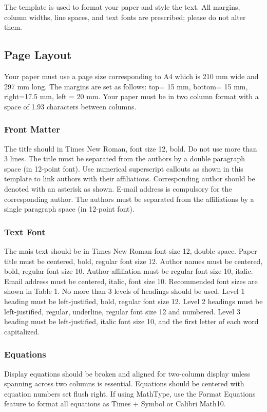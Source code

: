 \documentclass{siintec}
\begin{document}
The template is used to format your paper and style the text. All margins, column widths, line spaces, and text fonts are prescribed; please do not alter them. 

\subsection{Page Layout}
Your paper must use a page size corresponding to A4 which is 210 mm wide and 297 mm long. The margins are set as follows: top= 15 mm, bottom= 15 mm, right=17.5 mm, left = 20 mm. Your paper must be in two column format with a space of 1.93 characters between columns.

\subsubsection{Front Matter}
The title should in Times New Roman, font size 12, bold. Do not use more than 3 lines. The title must be separated from the authors by a double paragraph space (in 12-point font). Use numerical superscript callouts as shown in this template to link authors with their affiliations.
Corresponding author should be denoted with an asterisk as shown. E-mail address is compulsory for the corresponding author.
The authors must be separated from the affiliations by a single paragraph space (in 12-point font).

\subsubsection{Text Font}
The mais text should be in Times New Roman font size 12, double space. Paper title must be centered, bold, regular font size 12. Author names must be centered, bold, regular font size 10. Author affiliation must be regular font size 10, italic. Email address must be centered, italic, font size 10. Recommended font sizes are shown in Table 1. No more than 3 levels of headings should be used. Level 1 heading must be left-justified, bold, regular font size 12. Level 2 headings must be left-justified, regular, underline, regular font size 12 and numbered. Level 3 heading must be left-justified, italic font size 10, and the first letter of each word capitalized.

\subsubsection{Equations}
Display equations should be broken and aligned for two-column display unless spanning across two columns is essential. Equations should be centered with equation numbers set flush right. If using MathType, use the Format Equations feature to format all equations as Times + Symbol  or Calibri Math10.
\end{document}

